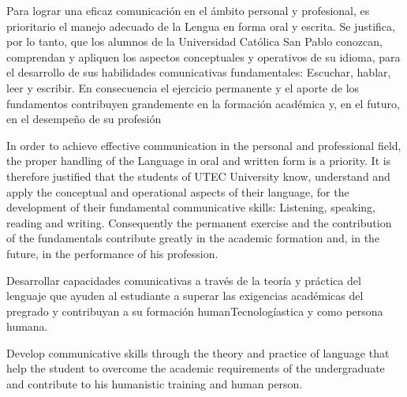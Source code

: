 \begin{syllabus}


\begin{justification}
Para lograr una eficaz comunicación en el ámbito personal y profesional, es prioritario el manejo adecuado de la Lengua en forma oral y escrita. Se justifica, por lo tanto, que los alumnos de la Universidad Católica San Pablo conozcan, comprendan y apliquen los aspectos conceptuales y operativos de su idioma, para el desarrollo de sus habilidades comunicativas fundamentales: Escuchar, hablar, leer y escribir.
En consecuencia el ejercicio permanente y el aporte de los fundamentos contribuyen grandemente en la formación académica y, en el futuro, en el desempeño de su profesión

In order to achieve effective communication in the personal and professional field, the proper handling of the Language in oral and written form is a priority. It is therefore justified that the students of UTEC University know, understand and apply the conceptual and operational aspects of their language, for the development of their fundamental communicative skills: Listening, speaking, reading and writing.
Consequently the permanent exercise and the contribution of the fundamentals contribute greatly in the academic formation and, in the future, in the performance of his profession.
\end{justification}

\begin{goals}
\item Desarrollar capacidades comunicativas a través de la teoría y práctica del lenguaje que ayuden al estudiante a superar las exigencias académicas del pregrado y contribuyan a su formación humanTecnologíastica y como persona humana.

\item Develop communicative skills through the theory and practice of language that help the student to overcome the academic requirements of the undergraduate and contribute to his humanistic training and human person.
\end{goals}

\begin{outcomes}
    \item {}
    \item {}
\end{outcomes}


\end{syllabus}
